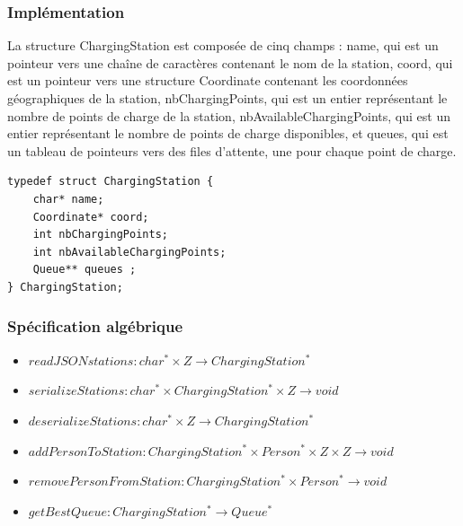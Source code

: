 \documentclass[french,a4paper]{article}
\begin{document}
\begin{center}
\end{center}

\subsubsection{Implémentation}
La structure ChargingStation est composée de cinq champs : name, qui est un pointeur vers une chaîne de caractères contenant le nom de la station, coord, qui est un pointeur vers une structure Coordinate contenant les coordonnées géographiques de la station, nbChargingPoints, qui est un entier représentant le nombre de points de charge de la station, nbAvailableChargingPoints, qui est un entier représentant le nombre de points de charge disponibles, et queues, qui est un tableau de pointeurs vers des files d'attente, une pour chaque point de charge. \\

\begin{center}
    \begin{lstlisting}[caption=Structure ChargingStation]
typedef struct ChargingStation {
    char* name;
    Coordinate* coord;
    int nbChargingPoints;
    int nbAvailableChargingPoints;
    Queue** queues ;
} ChargingStation;
        \end{lstlisting}
\end{center}

\subsubsection{Spécification algébrique}

\begin{itemize}
    \item $readJSONstations : char^* \times {Z} \rightarrow ChargingStation^*$
    \item $serializeStations : char^* \times ChargingStation^* \times {Z} \rightarrow void$
    \item $deserializeStations : char^* \times {Z} \rightarrow ChargingStation^*$
    \item $addPersonToStation : ChargingStation^* \times Person^* \times {Z} \times {Z} \rightarrow void$
    \item $removePersonFromStation : ChargingStation^* \times Person^* \rightarrow void$
    \item $getBestQueue : ChargingStation^* \rightarrow Queue^*$
\end{itemize}
\end{document}
